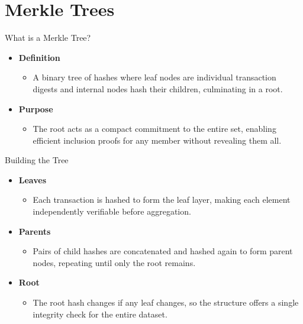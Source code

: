 \documentclass[aspectratio=169]{beamer}
\begin{document}
\section{Merkle Trees}

\begin{frame}{What is a Merkle Tree?}
  \begin{itemize}
    \item \textbf{Definition}
      \begin{itemize}
        \item A binary tree of hashes where leaf nodes are individual transaction digests and internal nodes hash their children, culminating in a root.
      \end{itemize}
    \item \textbf{Purpose}
      \begin{itemize}
        \item The root acts as a compact commitment to the entire set, enabling efficient inclusion proofs for any member without revealing them all.
      \end{itemize}
  \end{itemize}
\end{frame}

\begin{frame}{Building the Tree}
  \begin{itemize}
    \item \textbf{Leaves}
      \begin{itemize}
        \item Each transaction is hashed to form the leaf layer, making each element independently verifiable before aggregation.
      \end{itemize}
    \item \textbf{Parents}
      \begin{itemize}
        \item Pairs of child hashes are concatenated and hashed again to form parent nodes, repeating until only the root remains.
      \end{itemize}
    \item \textbf{Root}
      \begin{itemize}
        \item The root hash changes if any leaf changes, so the structure offers a single integrity check for the entire dataset.
      \end{itemize}
  \end{itemize}
\end{frame}
\end{document}
